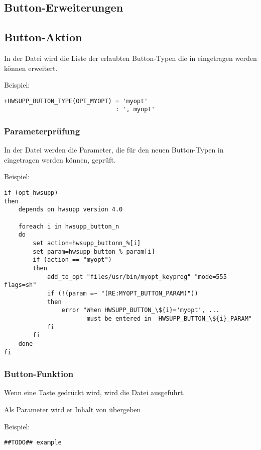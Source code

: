 \subsection{Button-Erweiterungen}
\subsection{Button-Aktion}
  In der Datei  wird die Liste der erlaubten Button-Typen
  die in  eingetragen werden können erweitert.

Beispiel:
\begin{verbatim}
+HWSUPP_BUTTON_TYPE(OPT_MYOPT) = 'myopt' 
                               : ', myopt'
\end{verbatim}

\subsubsection{Parameterprüfung}
  In der Datei  werden die Parameter, die für den neuen
  Button-Typen in  eingetragen werden können, geprüft.

Beispiel:
\begin{verbatim}
if (opt_hwsupp)
then
    depends on hwsupp version 4.0

    foreach i in hwsupp_button_n
    do
        set action=hwsupp_buttonn_%[i]
        set param=hwsupp_button_%_param[i]
        if (action == "myopt")
        then
            add_to_opt "files/usr/bin/myopt_keyprog" "mode=555 flags=sh"
            if (!(param =~ "(RE:MYOPT_BUTTON_PARAM)"))
            then
                error "When HWSUPP_BUTTON_\${i}='myopt', ...
                       must be entered in  HWSUPP_BUTTON_\${i}_PARAM" 
            fi
        fi
    done
fi
\end{verbatim}

\subsubsection {Button-Funktion}
  Wenn eine Taste gedrückt wird, wird die Datei 
  ausgeführt.
 
  Als Parameter wird er Inhalt von  übergeben

Beispiel:
\begin{verbatim}
##TODO## example
\end{verbatim}
